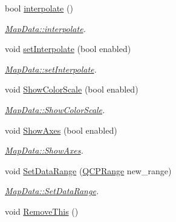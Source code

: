 \begin{DoxyCompactItemize}
\item 
bool \hyperlink{class_map_data_af6a0e12976a942f506035051162e6bac}{interpolate} ()
\begin{DoxyCompactList}\small\item\em \hyperlink{class_map_data_af6a0e12976a942f506035051162e6bac}{Map\+Data\+::interpolate}. \end{DoxyCompactList}\item 
void \hyperlink{class_map_data_a61607dc64ab986d73904ea00a8801284}{set\+Interpolate} (bool enabled)
\begin{DoxyCompactList}\small\item\em \hyperlink{class_map_data_a61607dc64ab986d73904ea00a8801284}{Map\+Data\+::set\+Interpolate}. \end{DoxyCompactList}\item 
void \hyperlink{class_map_data_af6be86434180cebe257194b25eb3b26b}{Show\+Color\+Scale} (bool enabled)
\begin{DoxyCompactList}\small\item\em \hyperlink{class_map_data_af6be86434180cebe257194b25eb3b26b}{Map\+Data\+::\+Show\+Color\+Scale}. \end{DoxyCompactList}\item 
void \hyperlink{class_map_data_a728ba9e61677b4f25c98d2579ec1ac6a}{Show\+Axes} (bool enabled)
\begin{DoxyCompactList}\small\item\em \hyperlink{class_map_data_a728ba9e61677b4f25c98d2579ec1ac6a}{Map\+Data\+::\+Show\+Axes}. \end{DoxyCompactList}\item 
void \hyperlink{class_map_data_a2a31f4dd7ede95fb61852db6cb815ca9}{Set\+Data\+Range} (\hyperlink{class_q_c_p_range}{Q\+C\+P\+Range} new\+\_\+range)
\begin{DoxyCompactList}\small\item\em \hyperlink{class_map_data_a2a31f4dd7ede95fb61852db6cb815ca9}{Map\+Data\+::\+Set\+Data\+Range}. \end{DoxyCompactList}\item 
void \hyperlink{class_map_data_aa98f0fec1e13eab7858dce7b7fe31561}{Remove\+This} ()\hypertarget{class_map_data_aa98f0fec1e13eab7858dce7b7fe31561}{}\label{class_map_data_aa98f0fec1e13eab7858dce7b7fe31561}


\end{DoxyCompactItemize}
